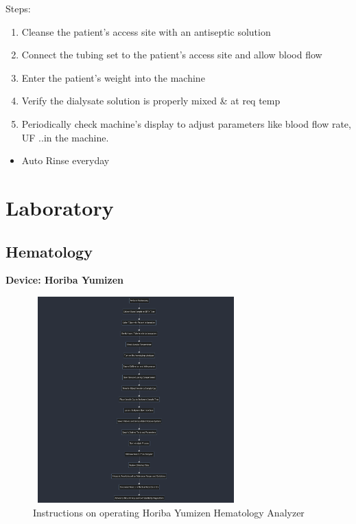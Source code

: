 \documentclass[
  11pt,
  letterpaper,
  DIV=11,
  numbers=noendperiod]{scrreprt}
\providecommand{\tightlist}{%
  \setlength{\itemsep}{0pt}\setlength{\parskip}{0pt}}\usepackage{longtable,booktabs,array}
\begin{document}
Steps:

\begin{enumerate}
\def\labelenumi{\arabic{enumi}.}
\tightlist
\item
  Cleanse the patient's access site with an antiseptic solution
\item
  Connect the tubing set to the patient's access site and allow blood
  flow
\item
  Enter the patient's weight into the machine
\item
  Verify the dialysate solution is properly mixed \& at req temp
\item
  Periodically check machine's display to adjust parameters like blood
  flow rate, UF ..in the machine.
\end{enumerate}

\begin{itemize}
\tightlist
\item
  Auto Rinse everyday
\end{itemize}

\section{Laboratory}\label{laboratory}

\subsection{Hematology}\label{hematology}

\textbf{Device: Horiba Yumizen}

\begin{figure}[H]

{\centering \includegraphics[width=3.125in,height=3.125in]{Beyond the Sterile Walls e0cff5645ec24545a8c247940fff8e84/Untitled 6.png}

}

\caption{Instructions on operating Horiba Yumizen Hematology Analyzer}

\end{figure}%
\end{document}
